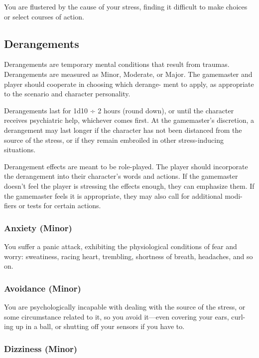 You are flustered by the cause of your stress, finding it 
difficult to make choices or select courses of action.

\subsection{Derangements}

Derangements are temporary mental conditions that 
result from traumas. Derangements are measured as 
Minor, Moderate, or Major. The gamemaster and 
player should cooperate in choosing which derange-
ment to apply, as appropriate to the scenario and 
character personality.

Derangements last for 1d10 ÷ 2 hours (round 
down), or until the character receives psychiatric help, 
whichever comes first. At the gamemaster's discretion, 
a derangement may last longer if the character has not 
been distanced from the source of the stress, or if they 
remain embroiled in other stress-inducing situations.

Derangement effects are meant to be role-played. 
The player should incorporate the derangement into 
their character's words and actions. If the gamemaster 
doesn't feel the player is stressing the effects enough, 
they can emphasize them. If the gamemaster feels it is 
appropriate, they may also call for additional modi-
fiers or tests for certain actions.

\subsubsection{Anxiety (Minor)}

You suffer a panic attack, exhibiting the physiological 
conditions of fear and worry: sweatiness, racing heart, 
trembling, shortness of breath, headaches, and so on.

\subsubsection{Avoidance (Minor)}

You are psychologically incapable with dealing with 
the source of the stress, or some circumstance related 
to it, so you avoid it—even covering your ears, curl-
ing up in a ball, or shutting off your sensors if you 
have to.

\subsubsection{Dizziness (Minor)}

